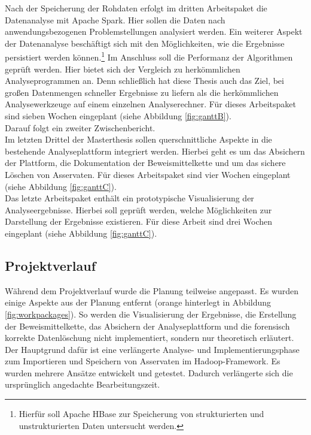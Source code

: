 \noindent
Nach der Speicherung der Rohdaten erfolgt im dritten Arbeitspaket die Datenanalyse mit Apache Spark. Hier sollen die Daten nach anwendungsbezogenen Problemstellungen analysiert werden. Ein weiterer Aspekt der Datenanalyse beschäftigt sich mit den Möglichkeiten, wie die Ergebnisse persistiert werden können.\footnote{Hierfür soll Apache HBase zur Speicherung von strukturierten und unstrukturierten Daten untersucht werden.} Im Anschluss soll die Performanz der Algorithmen geprüft werden. Hier bietet sich der Vergleich zu herkömmlichen Analyseprogrammen an. Denn schließlich hat diese Thesis auch das Ziel, bei großen Datenmengen schneller Ergebnisse zu liefern als die herkömmlichen Analysewerkzeuge auf einem einzelnen Analyserechner. Für dieses Arbeitspaket sind sieben Wochen eingeplant (siehe Abbildung \ref{fig:ganttB}).\\
 Darauf folgt ein zweiter Zwischenbericht.\\

\noindent
Im letzten Drittel der Masterthesis sollen querschnittliche Aspekte in die bestehende Analyseplattform integriert werden. Hierbei geht es um das Absichern der Plattform, die Dokumentation der Beweismittelkette und um das sichere Löschen von Asservaten. Für dieses Arbeitspaket sind vier Wochen eingeplant (siehe Abbildung \ref{fig:ganttC}).\\

\noindent
Das letzte Arbeitspaket enthält ein prototypische Visualisierung der Analyseergebnisse. Hierbei soll geprüft werden, welche Möglichkeiten zur Darstellung der Ergebnisse existieren. Für diese Arbeit sind drei Wochen eingeplant (siehe Abbildung \ref{fig:ganttC}).\\

\subsection*{Projektverlauf}
Während dem Projektverlauf wurde die Planung teilweise angepasst. Es wurden einige Aspekte aus der Planung entfernt (orange hinterlegt in Abbildung \ref{fig:workpackages}). So werden die Visualisierung der Ergebnisse, die Erstellung der Beweismittelkette, das Absichern der Analyseplattform und die forensisch korrekte Datenlöschung nicht implementiert, sondern nur theoretisch erläutert. Der Hauptgrund dafür ist eine verlängerte Analyse- und Implementierungsphase zum Importieren und Speichern von Asservaten im Hadoop-Framework. Es wurden mehrere Ansätze entwickelt und getestet. Dadurch verlängerte sich die ursprünglich angedachte Bearbeitungszeit.\\

